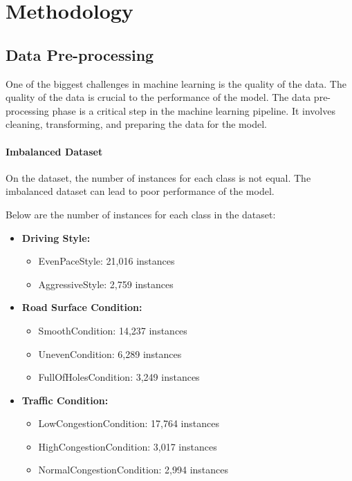 \chapter{Methodology}

\section{Data Pre-processing}
One of the biggest challenges in machine learning is the quality of the data. The quality of the data is crucial to the performance of the model. 
The data pre-processing phase is a critical step in the machine learning pipeline. It involves cleaning, transforming, and preparing the data for the model. 


\subsubsection{Imbalanced Dataset}
On the dataset, the number of instances for each class is not equal. The imbalanced dataset can lead to poor performance of the model. 

Below are the number of instances for each class in the dataset:

\begin{itemize}
    \item \textbf{Driving Style:}
    \begin{itemize}
        \item EvenPaceStyle: 21,016 instances
        \item AggressiveStyle: 2,759 instances
    \end{itemize}
    \item \textbf{Road Surface Condition:}
    \begin{itemize}
        \item SmoothCondition: 14,237 instances
        \item UnevenCondition: 6,289 instances
        \item FullOfHolesCondition: 3,249 instances
    \end{itemize}
    \item \textbf{Traffic Condition:}
    \begin{itemize}
        \item LowCongestionCondition: 17,764 instances
        \item HighCongestionCondition: 3,017 instances
        \item NormalCongestionCondition: 2,994 instances
    \end{itemize}
\end{itemize}

